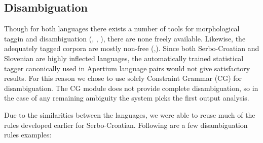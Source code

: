 
\subsection{Disambiguation}
Though for both languages there exists a number of tools for
morphological taggin and disambiguation (\citealp{vitas2004intex}, \citealp{agic2008improving}, \citealp{snajder08automatic}), there
are none freely available. Likewise, the adequately tagged corpora are
mostly non-free (\citealp{erjavec2004multext},\citealp{tadic2002building}).  Since both Serbo-Croatian and Slovenian are
highly inflected languages, the automatically trained statistical
tagger canonically used in Apertium language pairs would not give
satisfactory results. For this reason we chose to use solely
Constraint Grammar (CG) for disambiguation. The CG module does not
provide complete disambiguation, so in the case of any remaining
ambiguity the system picks the first output analysis.

Due to the similarities between the languages, we were able to
reuse much of the rules developed earlier for Serbo-Croatian. Following are
a few disambiguation rules examples:


